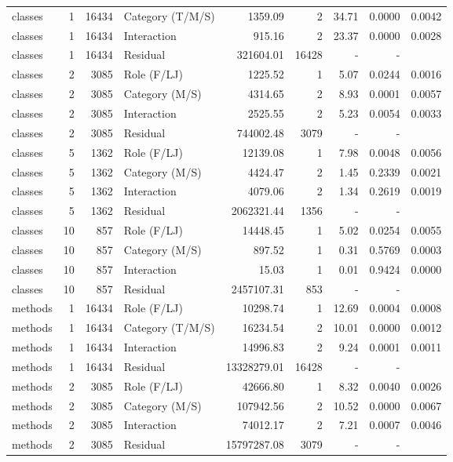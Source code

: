 \begin{table}[H]
{\begin{tabular}{l r r l r r r r r}
classes & 1 & 16434 & Category (T/M/S) & 1359.09 & 2 & 34.71 & 0.0000 & 0.0042 \\ 
classes & 1 & 16434 & Interaction & 915.16 & 2 & 23.37 & 0.0000 & 0.0028 \\ 
classes & 1 & 16434 & Residual & 321604.01 & 16428 & - & -  \\ 
classes & 2 & 3085 & Role (F/LJ) & 1225.52 & 1 & 5.07 & 0.0244 & 0.0016 \\ 
classes & 2 & 3085 & Category (M/S) & 4314.65 & 2 & 8.93 & 0.0001 & 0.0057 \\ 
classes & 2 & 3085 & Interaction & 2525.55 & 2 & 5.23 & 0.0054 & 0.0033 \\ 
classes & 2 & 3085 & Residual & 744002.48 & 3079 & - & -  \\ 
classes & 5 & 1362 & Role (F/LJ) & 12139.08 & 1 & 7.98 & 0.0048 & 0.0056 \\ 
classes & 5 & 1362 & Category (M/S) & 4424.47 & 2 & 1.45 & 0.2339 & 0.0021 \\ 
classes & 5 & 1362 & Interaction & 4079.06 & 2 & 1.34 & 0.2619 & 0.0019 \\ 
classes & 5 & 1362 & Residual & 2062321.44 & 1356 & - & -  \\ 
classes & 10 & 857 & Role (F/LJ) & 14448.45 & 1 & 5.02 & 0.0254 & 0.0055 \\ 
classes & 10 & 857 & Category (M/S) & 897.52 & 1 & 0.31 & 0.5769 & 0.0003 \\ 
classes & 10 & 857 & Interaction & 15.03 & 1 & 0.01 & 0.9424 & 0.0000 \\ 
classes & 10 & 857 & Residual & 2457107.31 & 853 & - & -  \\ 
methods & 1 & 16434 & Role (F/LJ) & 10298.74 & 1 & 12.69 & 0.0004 & 0.0008 \\ 
methods & 1 & 16434 & Category (T/M/S) & 16234.54 & 2 & 10.01 & 0.0000 & 0.0012 \\ 
methods & 1 & 16434 & Interaction & 14996.83 & 2 & 9.24 & 0.0001 & 0.0011 \\ 
methods & 1 & 16434 & Residual & 13328279.01 & 16428 & - & -  \\ 
methods & 2 & 3085 & Role (F/LJ) & 42666.80 & 1 & 8.32 & 0.0040 & 0.0026 \\ 
methods & 2 & 3085 & Category (M/S) & 107942.56 & 2 & 10.52 & 0.0000 & 0.0067 \\ 
methods & 2 & 3085 & Interaction & 74012.17 & 2 & 7.21 & 0.0007 & 0.0046 \\ 
methods & 2 & 3085 & Residual & 15797287.08 & 3079 & - & -  \\ 

\end{tabular}}
\end{table}
